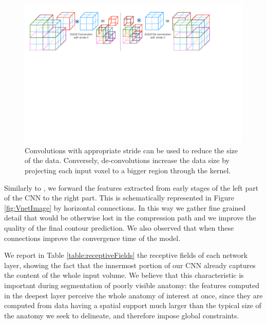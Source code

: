 \begin{figure} 	
\centering 	
\includegraphics[scale=0.34]{updown.pdf} 	
\caption{Convolutions with appropriate stride can be used to reduce the size of the data. Conversely, de-convolutions increase the data size by projecting each input voxel to a bigger region through the kernel.} \label{fig:updown} 
\end{figure}

Similarly to \cite{ronneberger2015u}, we forward the features extracted from early stages of the left part of the CNN to the right part. This is schematically represented in Figure \ref{fig:VnetImage} by horizontal connections. In this way we gather fine grained detail that would be otherwise lost in the compression path and we improve the quality of the final contour prediction. We also observed that when these connections improve the convergence time of the model.

We report in Table \ref{table:receptiveFields} the receptive fields of each network layer, showing the fact that the innermost portion of our CNN already captures the content of the whole input volume. We believe that this characteristic is important during segmentation of poorly visible anatomy: the features computed in the deepest layer perceive the whole anatomy of interest at once, since they are computed from data having a spatial support much larger than the typical size of the anatomy we seek to delineate, and therefore impose global constraints.


